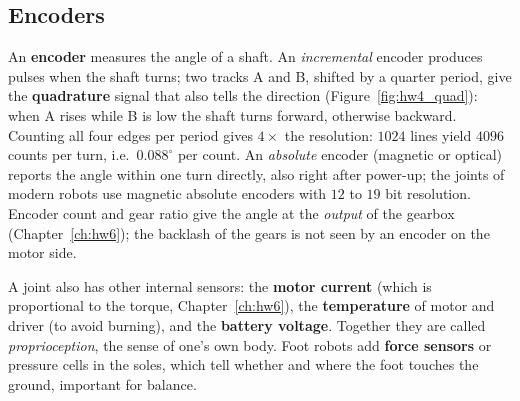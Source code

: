 \subsection*{Encoders}
An \textbf{encoder} measures the angle of a shaft. An \emph{incremental} encoder produces pulses when the shaft turns; two tracks A and B, shifted by a quarter period, give the \textbf{quadrature} signal that also tells the direction (Figure~\ref{fig:hw4_quad}): when A rises while B is low the shaft turns forward, otherwise backward. Counting all four edges per period gives $4\times$ the resolution: $1024$ lines yield $4096$ counts per turn, i.e.\ $0.088^\circ$ per count. An \emph{absolute} encoder (magnetic or optical) reports the angle within one turn directly, also right after power-up; the joints of modern robots use magnetic absolute encoders with $12$ to $19$ bit resolution. Encoder count and gear ratio give the angle at the \emph{output} of the gearbox (Chapter~\ref{ch:hw6}); the backlash of the gears is not seen by an encoder on the motor side.
\begin{center}
\label{fig:hw4_quad}
\end{center}
A joint also has other internal sensors: the \textbf{motor current} (which is proportional to the torque, Chapter~\ref{ch:hw6}), the \textbf{temperature} of motor and driver (to avoid burning), and the \textbf{battery voltage}. Together they are called \emph{proprioception}, the sense of one's own body. Foot robots add \textbf{force sensors} or pressure cells in the soles, which tell whether and where the foot touches the ground, important for balance.

